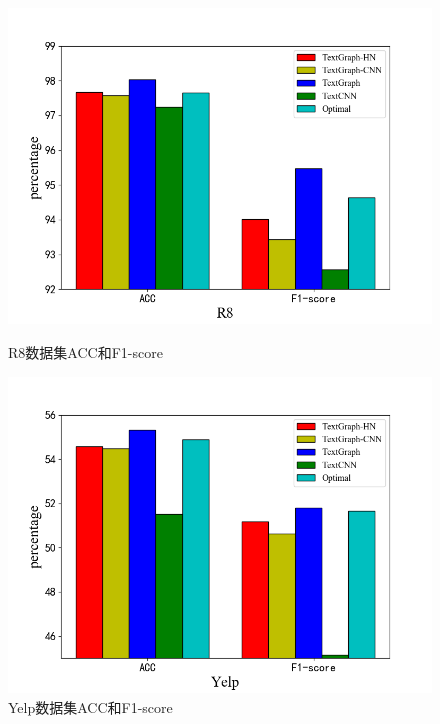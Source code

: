 \begin{figure}[htb]
    \begin{minipage}[t]{0.5\linewidth}
    \centering
    \includegraphics[width=1\textwidth]{pic/HisR8.png}
    \caption{R8数据集ACC和F1-score}
    \label{R8_acc_f1}
    \end{minipage}
    \quad
    \begin{minipage}[t]{0.5\linewidth}
    \centering
    \includegraphics[width=1\textwidth]{pic/HisYelp.png}
    \caption{Yelp数据集ACC和F1-score}
    \label{Yelp_acc_f1}
    \end{minipage}
\end{figure}

